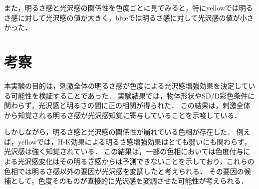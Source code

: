             また，明るさ感と光沢感の関係性を色度ごとに見てみると，特にyellowでは明るさ感に対して光沢感の値が大きく，blueでは明るさ感に対して光沢感の値が小さかった．


        \section{考察}
        
            本実験の目的は，刺激全体の明るさ感が色度による光沢感増強効果を決定している可能性を検証することであった．
            実験結果では，物体形状やSD/D彩色条件に関わらず，光沢感と明るさの間に正の相関が得られた．
            この結果は，刺激全体から知覚される明るさ感が光沢感知覚に寄与していることを示唆している．

            しかしながら，明るさ感と光沢感の関係性が崩れている色相が存在した．
            例えば，yellowでは，H-K効果による明るさ感増強効果はとても弱いにも関わらず，光沢感は強く知覚されている．
            この結果は，一部の色相においては色度付与による光沢感変化はその明るさ感からは予測できないことを示しており，これらの色相では明るさ感以外の要因が光沢感を変調したと考えられる．
            その要因の候補として，色度そのものが直接的に光沢感を変調させた可能性が考えられる．

    \newpage